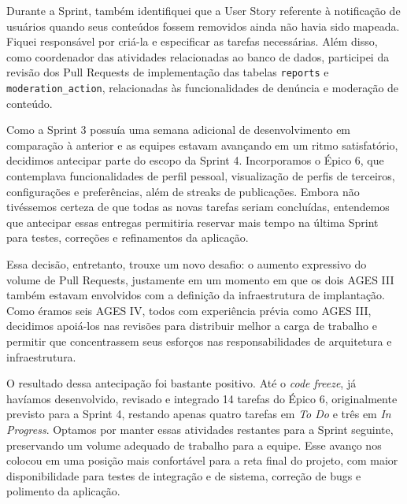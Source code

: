 \indent Durante a Sprint, também identifiquei que a User Story referente à notificação de usuários quando seus conteúdos fossem removidos ainda não havia sido mapeada. Fiquei responsável por criá-la e especificar as tarefas necessárias. Além disso, como coordenador das atividades relacionadas ao banco de dados, participei da revisão dos Pull Requests de implementação das tabelas \texttt{reports} e \texttt{moderation\_action}, relacionadas às funcionalidades de denúncia e moderação de conteúdo.\par

\indent Como a Sprint 3 possuía uma semana adicional de desenvolvimento em comparação à anterior e as equipes estavam avançando em um ritmo satisfatório, decidimos antecipar parte do escopo da Sprint 4. Incorporamos o Épico 6, que contemplava funcionalidades de perfil pessoal, visualização de perfis de terceiros, configurações e preferências, além de streaks de publicações. Embora não tivéssemos certeza de que todas as novas tarefas seriam concluídas, entendemos que antecipar essas entregas permitiria reservar mais tempo na última Sprint para testes, correções e refinamentos da aplicação.\par

\indent Essa decisão, entretanto, trouxe um novo desafio: o aumento expressivo do volume de Pull Requests, justamente em um momento em que os dois AGES III também estavam envolvidos com a definição da infraestrutura de implantação. Como éramos seis AGES IV, todos com experiência prévia como AGES III, decidimos apoiá-los nas revisões para distribuir melhor a carga de trabalho e permitir que concentrassem seus esforços nas responsabilidades de arquitetura e infraestrutura.\par

\indent O resultado dessa antecipação foi bastante positivo. Até o \textit{code freeze}, já havíamos desenvolvido, revisado e integrado 14 tarefas do Épico 6, originalmente previsto para a Sprint 4, restando apenas quatro tarefas em \textit{To Do} e três em \textit{In Progress}. Optamos por manter essas atividades restantes para a Sprint seguinte, preservando um volume adequado de trabalho para a equipe. Esse avanço nos colocou em uma posição mais confortável para a reta final do projeto, com maior disponibilidade para testes de integração e de sistema, correção de bugs e polimento da aplicação.\par

